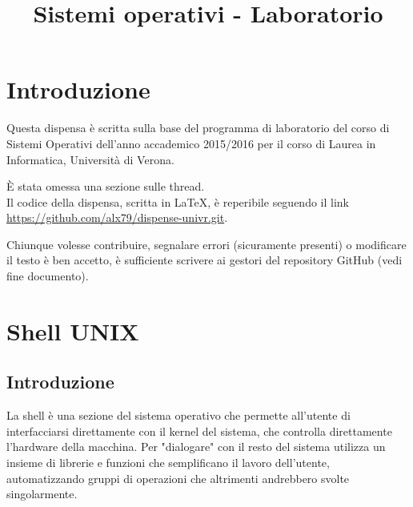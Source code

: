 \documentclass[a4paper]{article}
\begin{document}
\hypersetup{hidelinks, colorlinks = true, linkcolor = black}
\large
\title{Sistemi operativi - Laboratorio}
\pagestyle{fancy}
\maketitle
\newpage
{}
\tableofcontents
\newpage
{}

\section{Introduzione}
Questa dispensa è scritta sulla base del programma di laboratorio del corso di Sistemi Operativi dell'anno accademico 2015/2016 per il corso di Laurea in Informatica, Università di Verona.

È stata omessa una sezione sulle thread.\\

Il codice della dispensa, scritta in \LaTeX, è reperibile seguendo il link \url{https://github.com/alx79/dispense-univr.git}.

Chiunque volesse contribuire, segnalare errori (sicuramente presenti) o modificare il testo è ben accetto, è sufficiente scrivere ai gestori del repository GitHub (vedi fine documento).


\section{Shell UNIX}
\subsection{Introduzione}
La shell è una sezione del sistema operativo che permette all'utente di interfacciarsi direttamente con il kernel del sistema, che controlla direttamente l'hardware della macchina.
Per "dialogare" con il resto del sistema utilizza un insieme di librerie e funzioni che semplificano il lavoro dell'utente, automatizzando gruppi di operazioni che altrimenti andrebbero svolte singolarmente.
\end{document}

